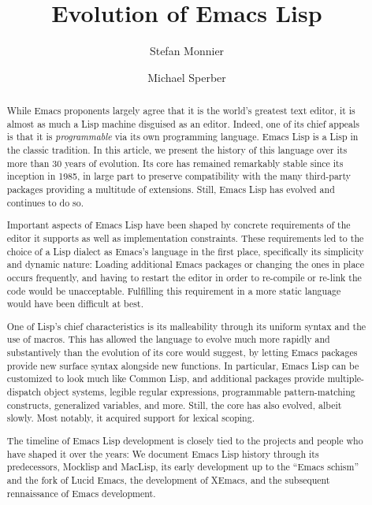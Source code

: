 \documentclass[format=acmsmall,screen]{acmart}
\begin{document}
\title{Evolution of Emacs Lisp}

\author{Stefan Monnier}
\author{Michael Sperber}


\begin{abstract}
While Emacs proponents largely agree that it is the world's greatest text editor, it is almost as much a Lisp machine disguised as an editor.  Indeed, one of its chief appeals is that it is \emph{programmable} via its own programming language.  Emacs Lisp is a Lisp in the classic tradition.  In this article, we present the history of this language over its more than 30 years of evolution.  Its core has remained remarkably stable since its inception in 1985, in large part to preserve compatibility with the many third-party packages providing a multitude of extensions.  Still, Emacs Lisp has evolved and continues to do so.

Important aspects of Emacs Lisp have been shaped by concrete requirements of the editor it supports  as well as implementation constraints.  These requirements led to the choice of a Lisp dialect as Emacs's language in the first place, specifically its simplicity and dynamic nature: Loading additional Emacs packages or changing the ones in place occurs frequently, and having to restart the editor in order to re-compile or re-link the code would be unacceptable.  Fulfilling this requirement in a more static language would have been difficult at best.

One of Lisp's chief characteristics is its malleability through its uniform syntax and the use of macros.  This has allowed the language to evolve much more rapidly and substantively than the evolution of its core would suggest, by letting Emacs packages provide new surface syntax alongside new functions.  In particular, Emacs Lisp can be customized to look much like Common Lisp, and additional packages provide multiple-dispatch object systems, legible regular expressions, programmable pattern-matching constructs, generalized variables, and more.  Still, the core has also evolved, albeit slowly.  Most notably, it acquired support for lexical scoping.

The timeline of Emacs Lisp development is closely tied to the projects and people who have shaped it over the years: We document Emacs Lisp history through its predecessors, Mocklisp and MacLisp, its early development up to the ``Emacs schism'' and the fork of Lucid Emacs, the development of XEmacs, and the subsequent rennaissance of Emacs development.
\end{abstract}
\end{document}
